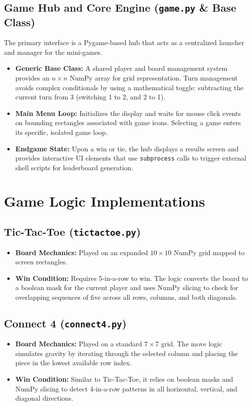\documentclass{report}
\begin{document}
\subsection{Game Hub and Core Engine (\texttt{game.py} \& Base Class)}
The primary interface is a Pygame-based hub that acts as a centralized launcher and manager for the mini-games.
\begin{itemize}
    \item \textbf{Generic Base Class:} A shared player and board management system provides an $n \times n$ NumPy array for grid representation. Turn management avoids complex conditionals by using a mathematical toggle: subtracting the current turn from 3 (switching 1 to 2, and 2 to 1).
    \item \textbf{Main Menu Loop:} Initializes the display and waits for mouse click events on bounding rectangles associated with game icons. Selecting a game enters its specific, isolated game loop.
    \item \textbf{Endgame State:} Upon a win or tie, the hub displays a results screen and provides interactive UI elements that use \texttt{subprocess} calls to trigger external shell scripts for leaderboard generation.
\end{itemize}

\section{Game Logic Implementations}

\subsection{Tic-Tac-Toe (\texttt{tictactoe.py})}
\begin{itemize}
    \item \textbf{Board Mechanics:} Played on an expanded $10 \times 10$ NumPy grid mapped to screen rectangles.
    \item \textbf{Win Condition:} Requires 5-in-a-row to win. The logic converts the board to a boolean mask for the current player and uses NumPy slicing to check for overlapping sequences of five across all rows, columns, and both diagonals.
\end{itemize}

\subsection{Connect 4 (\texttt{connect4.py})}
\begin{itemize}
    \item \textbf{Board Mechanics:} Played on a standard $7 \times 7$ grid. The move logic simulates gravity by iterating through the selected column and placing the piece in the lowest available row index.
    \item \textbf{Win Condition:} Similar to Tic-Tac-Toe, it relies on boolean masks and NumPy slicing to detect 4-in-a-row patterns in all horizontal, vertical, and diagonal directions.
\end{itemize}
\end{document}

